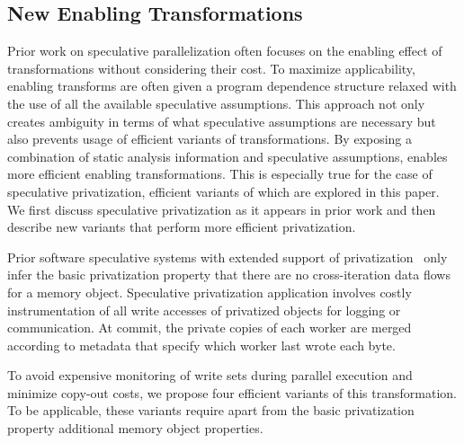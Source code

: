 \subsection{New Enabling Transformations}

Prior work on speculative parallelization often focuses on the
enabling effect of transformations without considering their cost.  To
maximize applicability, enabling transforms are often given a program
dependence structure relaxed with the use of all the available
speculative assumptions.  This approach not only creates ambiguity in
terms of what speculative assumptions are necessary but also prevents
usage of efficient variants of transformations.
%
By exposing a combination of static analysis information and
speculative assumptions, \name enables more efficient enabling
transformations.  This is especially true for the case of speculative
privatization, efficient variants of which are explored in this paper.
%
We first discuss speculative privatization as it appears in prior work
and then describe new variants that perform more efficient
privatization.

Prior software speculative systems with extended support of
privatization~\cite{johnson:12:pldi,kim:12:cgo} only infer the basic
privatization property that there are no cross-iteration data flows
for a memory object.
%
Speculative privatization application involves costly instrumentation
of all write accesses of privatized objects for logging or
communication. At commit, the private copies of each worker are merged
according to metadata that specify which worker last wrote each byte.

To avoid expensive monitoring of write sets during parallel execution
and minimize copy-out costs, we propose four efficient variants of
this transformation.
%
To be applicable, these variants require apart from the basic
privatization property additional memory object properties.

